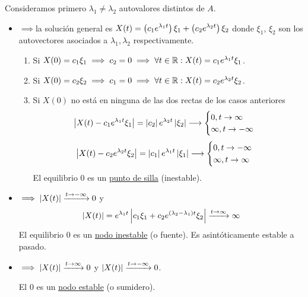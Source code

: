 Consideramos primero $\lambda_1 \neq \lambda_2$ autovalores distintos de $A$.
\begin{itemize}
	\item {}$\implies $la solución general es $\displaystyle X(t) = \left(c_1 e^{\lambda_1 t}\right) \xi_1 + \left(c_2 e^{\lambda_2 t}\right) \xi_2$
	      donde $\xi_1$, $\xi_2$ son los autovectores asociados a $\lambda_1, \lambda_2$ respectivamente.
	      \begin{enumerate} %
		      \item Si $X(0) = c_1 \xi_1 \implies c_2 = 0 \implies \forall t \in \mathbb{R} : X(t) = c_1 e^{\lambda_1 t} \xi_1$.
		      \item Si $X(0) = c_2 \xi_2 \implies c_1 = 0 \implies \forall t \in \mathbb{R} : X(t) = c_2 e^{\lambda_2 t} \xi_2$.
		      \item Si $X(0)$ no está en ninguna de las dos rectas de los casos anteriores
		            \[\left|X(t) - c_1 e^{\lambda_1 t} \xi_1\right| = \left|c_2\right| e^{\lambda_2 t} \left|\xi_2\right| \longrightarrow \begin{cases}
				            0, t\to\infty \\
				            \infty, t\to-\infty
			            \end{cases}\]
		            \[\left|X(t) - c_2 e^{\lambda_2 t} \xi_2\right| = \left|c_1\right| e^{\lambda_1 t} \left|\xi_1\right| \longrightarrow \begin{cases}
				            0, t\to-\infty \\
				            \infty, t\to\infty
			            \end{cases}\]
		            \hspace*{\fill} El equilibrio 0 es un \underline{punto de silla} (inestable).
	      \end{enumerate}
	\item {}$\implies \left|X(t)\right| \xrightarrow{t\to-\infty} 0$ y
	      \[\left|X(t)\right| = e^{\lambda_1 t} \left|c_1 \xi_1 + c_2 e^{(\lambda_2 - \lambda_1)t} \xi_2\right| \xrightarrow{t\to\infty} \infty\]
	      \hspace*{\fill} El equilibrio 0 es un \underline{nodo inestable} (o fuente). Es asintóticamente estable a pasado.
	\item {}$\implies \left|X(t)\right| \xrightarrow{t\to\infty} 0$ y $\left|X(t)\right| \xrightarrow{t\to-\infty} 0$.

	      \hspace*{\fill} El 0 es un \underline{nodo estable} (o sumidero).
\end{itemize}


